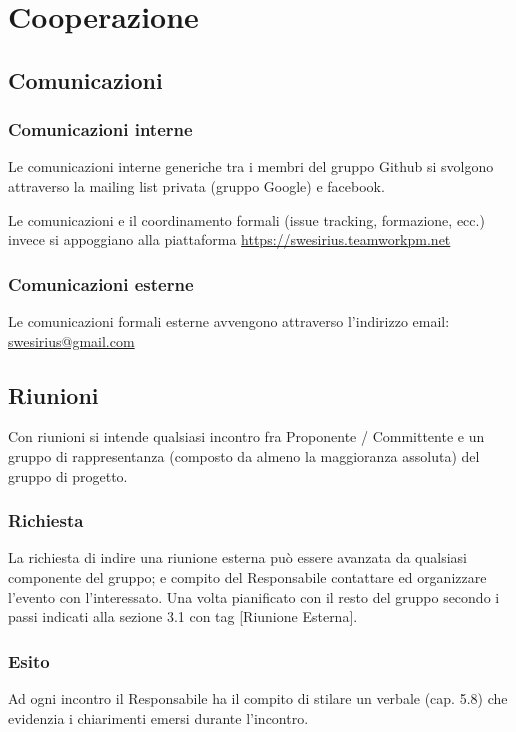 \section{Cooperazione}


\subsection{Comunicazioni}
\subsubsection{Comunicazioni interne}
Le comunicazioni interne generiche tra i membri del gruppo Github si svolgono attraverso la mailing list privata (gruppo Google) e facebook.

Le comunicazioni e il coordinamento formali (issue tracking, formazione, ecc.) invece si appoggiano alla piattaforma \url{https://swesirius.teamworkpm.net}
\subsubsection{Comunicazioni esterne}
Le comunicazioni formali esterne avvengono attraverso l’indirizzo email: \url{swesirius@gmail.com}

\subsection{Riunioni}
Con riunioni si intende qualsiasi incontro fra Proponente / Committente e un gruppo di rappresentanza (composto da almeno la maggioranza assoluta) del gruppo di progetto.

\subsubsection{Richiesta}

La richiesta di indire una riunione esterna può essere avanzata da qualsiasi componente del gruppo; e compito del Responsabile contattare ed organizzare l'evento con l'interessato. 
Una volta pianificato con il resto del gruppo secondo i passi indicati alla sezione 3.1 con tag [Riunione Esterna].

\subsubsection{Esito}

Ad ogni incontro il Responsabile ha il compito di stilare un verbale (cap. 5.8) che evidenzia i chiarimenti emersi durante l'incontro.

